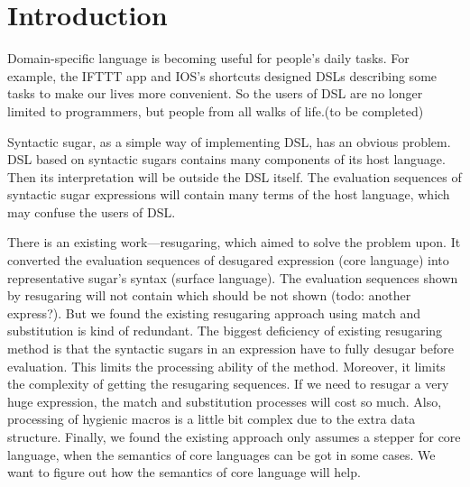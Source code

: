 \section{Introduction}







Domain-specific language\cite{dsl} is becoming useful for people's daily tasks. For example, the IFTTT app and IOS's shortcuts designed DSLs describing some tasks to make our lives more convenient. So the users of DSL are no longer limited to programmers, but people from all walks of life.(to be completed)

Syntactic sugar\cite{syntacticsugar}, as a simple way of implementing DSL, has an obvious problem. DSL based on syntactic sugars contains many components of its host language. Then its interpretation will be outside the DSL itself. The evaluation sequences of syntactic sugar expressions will contain many terms of the host language, which may confuse the users of DSL.

There is an existing work---resugaring\cite{resugaring}\cite{hygienic}, which aimed to solve the problem upon. It converted the evaluation sequences of desugared expression (core language) into representative sugar's syntax (surface language). The evaluation sequences shown by resugaring will not contain which should be not shown (todo: another express?). But we found the existing resugaring approach using match and substitution is kind of redundant. The biggest deficiency of existing resugaring method is that the syntactic sugars in an expression have to fully desugar before evaluation. This limits the processing ability of the method. Moreover, it limits the complexity of getting the resugaring sequences. If we need to resugar a very huge expression, the match and substitution processes will cost so much. Also, processing of hygienic macros is a little bit complex due to the extra data structure. Finally, we found the existing approach only assumes a stepper for core language, when the semantics of core languages can be got in some cases. We want to figure out how the semantics of core language will help.

